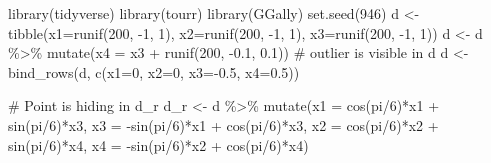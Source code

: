 \documentclass[
  letterpaper,
]{krantz}
\newenvironment{Shaded}{\begin{snugshade}}{\end{snugshade}}
\newcommand{\AttributeTok}[1]{\textcolor[rgb]{0.40,0.45,0.13}{#1}}
\newcommand{\CommentTok}[1]{\textcolor[rgb]{0.37,0.37,0.37}{#1}}
\newcommand{\DecValTok}[1]{\textcolor[rgb]{0.68,0.00,0.00}{#1}}
\newcommand{\FloatTok}[1]{\textcolor[rgb]{0.68,0.00,0.00}{#1}}
\newcommand{\FunctionTok}[1]{\textcolor[rgb]{0.28,0.35,0.67}{#1}}
\newcommand{\NormalTok}[1]{\textcolor[rgb]{0.00,0.23,0.31}{#1}}
\newcommand{\OtherTok}[1]{\textcolor[rgb]{0.00,0.23,0.31}{#1}}
\newcommand{\SpecialCharTok}[1]{\textcolor[rgb]{0.37,0.37,0.37}{#1}}
\begin{document}
\begin{Shaded}
\begin{Highlighting}[]
\FunctionTok{library}\NormalTok{(tidyverse)}
\FunctionTok{library}\NormalTok{(tourr)}
\FunctionTok{library}\NormalTok{(GGally)}
\FunctionTok{set.seed}\NormalTok{(}\DecValTok{946}\NormalTok{)}
\NormalTok{d }\OtherTok{\textless{}{-}} \FunctionTok{tibble}\NormalTok{(}\AttributeTok{x1=}\FunctionTok{runif}\NormalTok{(}\DecValTok{200}\NormalTok{, }\SpecialCharTok{{-}}\DecValTok{1}\NormalTok{, }\DecValTok{1}\NormalTok{), }
            \AttributeTok{x2=}\FunctionTok{runif}\NormalTok{(}\DecValTok{200}\NormalTok{, }\SpecialCharTok{{-}}\DecValTok{1}\NormalTok{, }\DecValTok{1}\NormalTok{), }
            \AttributeTok{x3=}\FunctionTok{runif}\NormalTok{(}\DecValTok{200}\NormalTok{, }\SpecialCharTok{{-}}\DecValTok{1}\NormalTok{, }\DecValTok{1}\NormalTok{))}
\NormalTok{d }\OtherTok{\textless{}{-}}\NormalTok{ d }\SpecialCharTok{\%\textgreater{}\%}
  \FunctionTok{mutate}\NormalTok{(}\AttributeTok{x4 =}\NormalTok{ x3 }\SpecialCharTok{+} \FunctionTok{runif}\NormalTok{(}\DecValTok{200}\NormalTok{, }\SpecialCharTok{{-}}\FloatTok{0.1}\NormalTok{, }\FloatTok{0.1}\NormalTok{))}
\CommentTok{\# outlier is visible in d}
\NormalTok{d }\OtherTok{\textless{}{-}} \FunctionTok{bind\_rows}\NormalTok{(d, }\FunctionTok{c}\NormalTok{(}\AttributeTok{x1=}\DecValTok{0}\NormalTok{, }\AttributeTok{x2=}\DecValTok{0}\NormalTok{, }\AttributeTok{x3=}\SpecialCharTok{{-}}\FloatTok{0.5}\NormalTok{, }\AttributeTok{x4=}\FloatTok{0.5}\NormalTok{))}

\CommentTok{\# Point is hiding in d\_r}
\NormalTok{d\_r }\OtherTok{\textless{}{-}}\NormalTok{ d }\SpecialCharTok{\%\textgreater{}\%}
  \FunctionTok{mutate}\NormalTok{(}\AttributeTok{x1 =} \FunctionTok{cos}\NormalTok{(pi}\SpecialCharTok{/}\DecValTok{6}\NormalTok{)}\SpecialCharTok{*}\NormalTok{x1 }\SpecialCharTok{+} \FunctionTok{sin}\NormalTok{(pi}\SpecialCharTok{/}\DecValTok{6}\NormalTok{)}\SpecialCharTok{*}\NormalTok{x3,}
         \AttributeTok{x3 =} \SpecialCharTok{{-}}\FunctionTok{sin}\NormalTok{(pi}\SpecialCharTok{/}\DecValTok{6}\NormalTok{)}\SpecialCharTok{*}\NormalTok{x1 }\SpecialCharTok{+} \FunctionTok{cos}\NormalTok{(pi}\SpecialCharTok{/}\DecValTok{6}\NormalTok{)}\SpecialCharTok{*}\NormalTok{x3,}
         \AttributeTok{x2 =} \FunctionTok{cos}\NormalTok{(pi}\SpecialCharTok{/}\DecValTok{6}\NormalTok{)}\SpecialCharTok{*}\NormalTok{x2 }\SpecialCharTok{+} \FunctionTok{sin}\NormalTok{(pi}\SpecialCharTok{/}\DecValTok{6}\NormalTok{)}\SpecialCharTok{*}\NormalTok{x4,}
         \AttributeTok{x4 =} \SpecialCharTok{{-}}\FunctionTok{sin}\NormalTok{(pi}\SpecialCharTok{/}\DecValTok{6}\NormalTok{)}\SpecialCharTok{*}\NormalTok{x2 }\SpecialCharTok{+} \FunctionTok{cos}\NormalTok{(pi}\SpecialCharTok{/}\DecValTok{6}\NormalTok{)}\SpecialCharTok{*}\NormalTok{x4)}
\end{Highlighting}
\end{Shaded}
\end{document}

